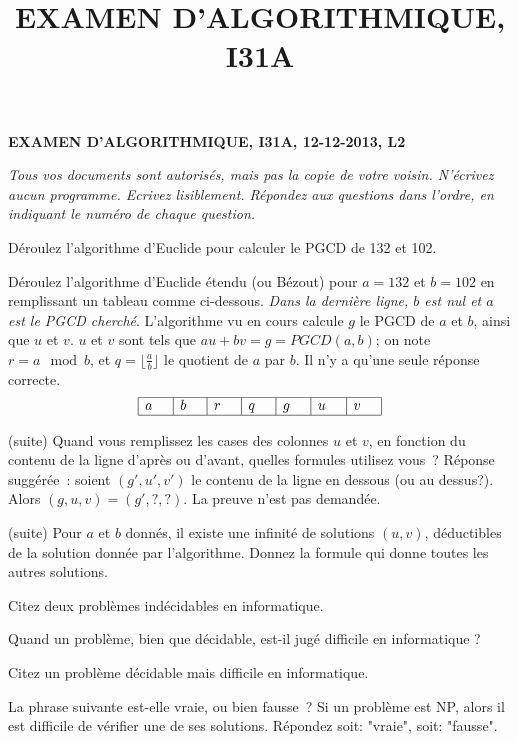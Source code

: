 \documentclass[11pt]{article}
\begin{document}
\title{EXAMEN D'ALGORITHMIQUE, I31A}
\date{}%
{\bf\large EXAMEN D'ALGORITHMIQUE, I31A, 12-12-2013, L2} 

\medskip

{\it Tous vos documents sont autorisés, mais pas la copie de votre voisin.
N'écrivez aucun programme.
Ecrivez lisiblement.
Répondez aux questions dans l'ordre, en indiquant le numéro de chaque question.
}

\newcommand\q[1]{\smallskip \noindent {\bf #1.}}
\medskip 

\q{1}  {D\'eroulez l'algorithme d'Euclide pour calculer le PGCD de 132 et 102}.
~

\q{2} {D\'eroulez l'algorithme d'Euclide \'etendu (ou Bézout) pour $a=132$ et $b=102$ en remplissant un tableau comme ci-dessous. {\it Dans la dernière ligne, $b$ est nul et $a$ est le PGCD cherché}.
L'algorithme vu en cours calcule $g$ le PGCD de $a$ et $b$, ainsi que $u$ et $v$. $u$ et $v$ sont tels que $au+bv=g=PGCD(a,b)$; on note $r=a \mod b$, et $q=\lfloor \frac{a}{b}\rfloor$
le quotient de $a$ par $b$.   Il n'y a qu'une seule réponse correcte.
{\large
$$
\begin{array}{|c|c|c|c|c|c|c|}
\hline
a\quad & b \quad& r \quad& q \quad& g \quad& u \quad& v \quad\\
\hline
\end{array}$$
}

\q{3} (suite) Quand vous remplissez les cases des colonnes $u$ et $v$, en fonction du contenu de la ligne d'après ou d'avant, quelles formules utilisez vous~?
Réponse suggérée~: soient $(g', u', v')$ le contenu de la ligne en dessous (ou au dessus?).
Alors $(g,u,v)=(g',?,?)$. La preuve n'est pas demandée.
~


\q{4} (suite) Pour $a$ et $b$ donnés, il existe une infinité de solutions $(u, v)$, déductibles de la solution donnée par l'algorithme. 
Donnez la formule qui donne toutes les autres solutions.
~

\q{5} Citez deux problèmes indécidables en informatique.
~

\q{6} Quand un problème, bien que décidable, est-il jugé difficile en informatique ?
~

\q{7} Citez un problème décidable mais difficile en  informatique.
~

\q{8} La phrase suivante est-elle vraie,  ou bien fausse~? Si un problème est NP, alors il est difficile de vérifier une de ses solutions.  Répondez soit: "vraie", soit: "fausse".



}
\end{document}
